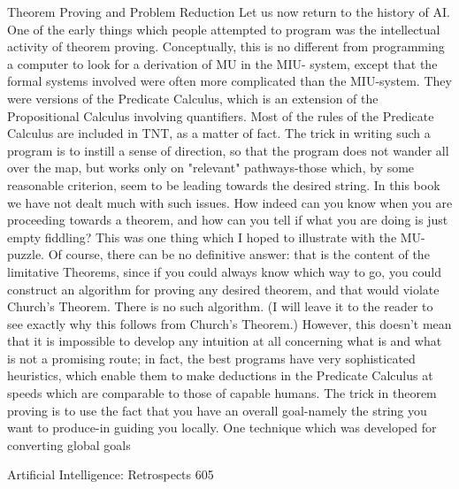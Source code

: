 {                   Theorem Proving and Problem Reduction
Let us now return to the history of AI. One of the early things which people attempted to
program was the intellectual activity of theorem proving. Conceptually, this is no
different from programming a computer to look for a derivation of MU in the MIU-
system, except that the formal systems involved were often more complicated than the
MIU-system. They were versions of the Predicate Calculus, which is an extension of the
Propositional Calculus involving quantifiers. Most of the rules of the Predicate Calculus
are included in TNT, as a matter of fact. The trick in writing such a program is to instill a
sense of direction, so that the program does not wander all over the map, but works only
on "relevant" pathways-those which, by some reasonable criterion, seem to be leading
towards the desired string.
     In this book we have not dealt much with such issues. How indeed can you know
when you are proceeding towards a theorem, and how can you tell if what you are doing
is just empty fiddling? This was one thing which I hoped to illustrate with the MU-
puzzle. Of course, there can be no definitive answer: that is the content of the limitative
Theorems, since if you could always know which way to go, you could construct an
algorithm for proving any desired theorem, and that would violate Church's Theorem.
There is no such algorithm. (I will leave it to the reader to see exactly why this follows
from Church's Theorem.) However, this doesn't mean that it is impossible to develop any
intuition at all concerning what is and what is not a promising route; in fact, the best
programs have very sophisticated heuristics, which enable them to make deductions in
the Predicate Calculus at speeds which are comparable to those of capable humans.
     The trick in theorem proving is to use the fact that you have an overall goal-namely
the string you want to produce-in guiding you locally. One technique which was
developed for converting global goals




Artificial Intelligence: Retrospects                                                     605

}
